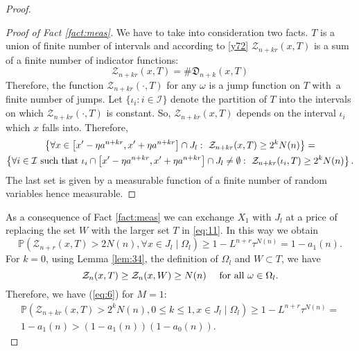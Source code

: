 \documentclass[amssymb,amsfonts,12pt,verbatim,righttag,oneside]{amsart}
\numberwithin{equation}{section} %
\theoremstyle{plain}
\newcommand{\fmu}{\ensuremath{\,}}
\newcommand*{\pr}{\ensuremath{\mathbb{P}}}
\newcommand*{\Z}{\ensuremath{\mathcal{Z}}}
\newcommand*{\HH}{\ensuremath{T}}
\theoremstyle{plain}
\begin{document}
\begin{proof}
\begin{proof}[Proof of Fact \ref{fact:meas}]
We have to take into consideration two facts. $\HH$ is a union of finite number of intervals and according to \eqref{y72}
$\Z_{n+kr}(x,\HH)$ is a sum of a finite number of indicator functions:
\begin{equation*}
 \Z_{n+kr}(x,\HH)=
 \#\mathfrak{D}_{n+k}(x,T)
\end{equation*}
Therefore, the function $\Z_{n+kr}(\cdot ,\HH)$ for any $\omega$ is a jump function on
$T$ with \fmu a finite number of jumps. Let $\{\iota_i:i\in \mathcal{I}\}$ denote the partition of $T$
into the intervals on which $\Z_{n+kr}(\cdot ,\HH)$ is constant. So, $\Z_{n+kr}(x ,\HH)$ depends
on the interval $\iota_i$ which $x$ falls into. Therefore,
\begin{multline*}
 \left\{\forall x\in \left[x'- \eta a^{n+kr},x'+ \eta a^{n+kr}\right]\cap J_l:\
 \Z_{n+kr}(x,\HH)\geq 2^kN(n) \right\}=
\\
\left\{\forall i\in \mathcal{I}\hbox{ such that } \iota_i\cap \left[x'- \eta a^{n+kr},x'+ \eta
a^{n+kr}\right]\cap J_l\neq\emptyset:\ \Z_{n+kr}(\iota_i,\HH)\geq 2^kN(n) \right\}.
\end{multline*}
The last set is given by a measurable function of a finite number of random variables
 hence measurable.
\end{proof}


As a consequence of Fact \ref{fact:meas} we can exchange $X_1$ with $J_l$ at a price of replacing the set $W$ with the larger set $T$ in \eqref{eq:11}.
In this way we  obtain
\begin{equation*}
 \pr \left( \Z_{n+r}(x,\HH)> 2 N(n),\forall  x\in J_l \mid \Omega_l\right)\geq
 1-L^{n+r}\tau^{N(n)}=1-a_1(n).
\end{equation*}
For $k=0$, using Lemma \ref{lem:34}, the definition of $\Omega_l$ and $W\subset \HH$, we
have
\begin{equation*}
\Z_n(x,\HH)\geq \Z_n(x,W)\geq N(n) \quad \hbox{ for all
}\omega\in\Omega_l.
\end{equation*}
Therefore, we have (\ref{eq:6}) for $M=1$:
\begin{multline*}
 \pr \left( \Z_{n+kr}(x,\HH)> 2^k N(n),0\leq k\leq 1,x\in J_l \mid \Omega_l\right)\geq
 1-L^{n+r}\tau^{N(n)}=
\\
1-a_1(n)>(1-a_1(n))(1-a_0(n)).
\end{multline*}

\bigskip


\end{proof}
\end{document}
